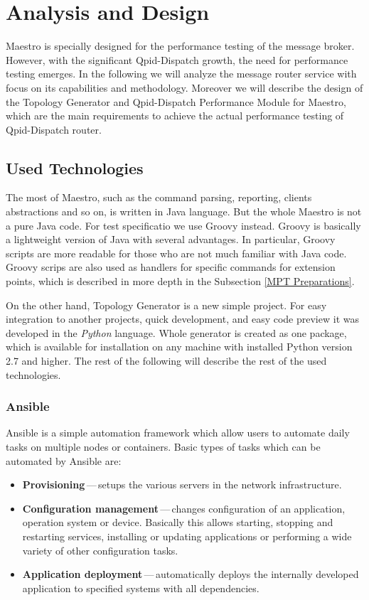 
\chapter{Analysis and Design}
\label{Analysis and Design}
Maestro is specially designed for the performance testing of the message broker. However, with the significant Qpid-Dispatch growth, the need for performance testing emerges. In the following we will analyze the message router service with focus on its capabilities and methodology. Moreover we will describe the design of the Topology Generator and Qpid-Dispatch Performance Module for Maestro, which are the main requirements to achieve the actual performance testing of Qpid-Dispatch router.

\section{Used Technologies}
The most of Maestro, such as the command parsing, reporting, clients abstractions and so on, is written in Java language. But the whole Maestro is not a pure Java code. For test specificatio we use Groovy instead. Groovy is basically a lightweight version of Java with several advantages. In particular, Groovy scripts are more readable for those who are not much familiar with Java code. Groovy scrips are also used as handlers for specific commands for extension points, which is described in more depth in the Subsection \ref{MPT Preparations}.

On the other hand, Topology Generator is a new simple project. For easy integration to another projects, quick development, and easy code preview it was developed in the \emph{Python} language. Whole generator is created as one package, which is available for installation on any machine with installed Python version 2.7 and higher. The rest of the following will describe the rest of the used technologies.

\subsection{Ansible}
Ansible \cite{Ansible} is a simple automation framework which allow users to automate daily tasks on multiple nodes or containers. Basic types of tasks which can be automated by Ansible are:

\begin{itemize}
	\item \textbf{Provisioning}\,---\,setups the various servers in the network infrastructure.
	\item \textbf{Configuration management}\,---\,changes configuration of an application, operation system or device. Basically this allows starting, stopping and restarting services, installing or updating applications or performing a wide variety of other configuration tasks.
	\item \textbf{Application deployment}\,---\,automatically deploys the internally developed application to specified systems with all dependencies.
\end{itemize}

